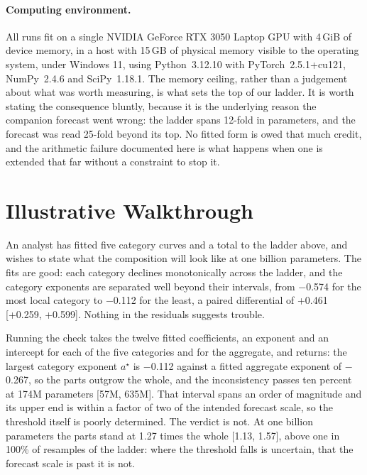 \documentclass[11pt]{article}
\begin{document}
\paragraph{Computing environment.}
All runs fit on a single NVIDIA GeForce RTX 3050 Laptop GPU with 4\,GiB of device
memory, in a host with 15\,GB of physical memory visible to the
operating system, under Windows 11, using Python~3.12.10 with
PyTorch~2.5.1+cu121, NumPy~2.4.6 and SciPy~1.18.1. The
memory ceiling, rather than a judgement about what was worth measuring, is what sets
the top of our ladder. It is worth stating the consequence bluntly, because it is
the underlying reason the companion forecast went wrong: the ladder spans
12-fold in parameters, and the forecast was read
25-fold beyond its top. No fitted form is owed that much
credit, and the arithmetic failure documented here is what happens when one is
extended that far without a constraint to stop it.

\section{Illustrative Walkthrough}
\label{sec:walk}

An analyst has fitted five category curves and a total to the ladder above, and
wishes to state what the composition will look like at one billion parameters. The
fits are good: each category declines monotonically across the ladder, and the
category exponents are separated well beyond their intervals, from
$-$0.574 for the most local category to $-$0.112 for the
least, a paired differential of +0.461
[+0.259, +0.599]. Nothing in the residuals
suggests trouble.

Running the check takes the twelve fitted coefficients, an exponent and an
intercept for each of the five categories and for the aggregate, and returns: the largest category exponent $a^\star$ is
$-$0.112 against a fitted aggregate exponent of $-$0.267, so the
parts outgrow the whole, and the inconsistency passes ten percent at
174M parameters [57M, 635M].
That interval spans an order of magnitude and its upper end is within a factor of two
of the intended forecast scale, so the threshold itself is poorly determined. The
verdict is not. At one billion parameters the parts stand at 1.27 times
the whole [1.13, 1.57], above one in
100\% of resamples of the ladder: where the threshold falls is
uncertain, that the forecast scale is past it is not.
\end{document}
